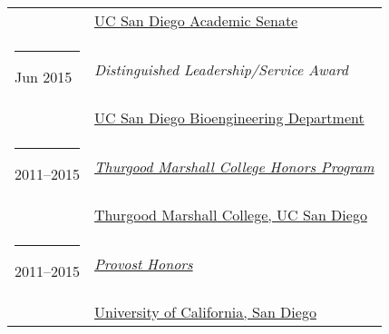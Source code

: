 \documentclass[margin,line]{res}
\begin{document}
\begin{resume}
\begin{longtable}{@{}p{0.7in}p{4in}}
\hspace*{-4mm} \hspace*{-4mm} & \hspace{4mm} \href{https://senate.ucsd.edu/}{UC San Diego Academic Senate}\\
\hspace*{-4mm} \rule{-1mm}{5mm} Jun 2015 & \textit{Distinguished Leadership/Service Award}\\*
\hspace*{-4mm} \hspace*{-4mm} & \hspace{4mm} \href{http://bioengineering.ucsd.edu/}{UC San Diego Bioengineering Department}\\
\hspace*{-4mm} \rule{-1mm}{5mm} 2011--2015 & \href{https://marshall.ucsd.edu/academics/academic-opportunities/tmc-honors-program.html}{\textit{Thurgood Marshall College Honors Program}}\\*
\hspace*{-4mm} \hspace*{-4mm} & \hspace{4mm} \href{https://marshall.ucsd.edu/}{Thurgood Marshall College, UC San Diego}\\
\hspace*{-4mm} \rule{-1mm}{5mm} 2011--2015 & \href{https://roosevelt.ucsd.edu/academics/Academic\%20Opportunities/honors/index.html#Provost-Honors}{\textit{Provost Honors}}\\*
\hspace*{-4mm} \hspace*{-4mm} & \hspace{4mm} \href{http://ucsd.edu/}{University of California, San Diego}\\
\end{longtable}


\end{resume}
\end{document}
